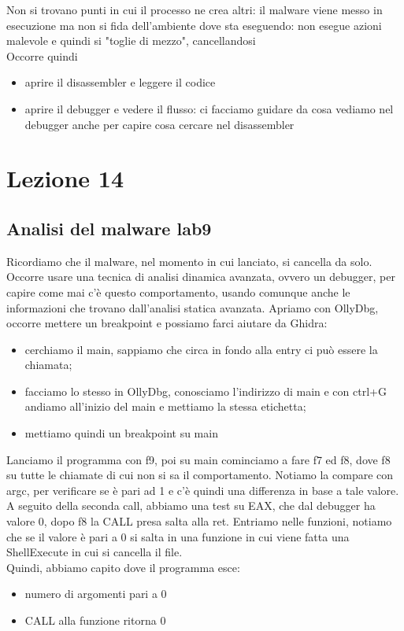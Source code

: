 \documentclass[12pt, oneside]{extbook}
\begin{document}
Non si trovano punti in cui il processo ne crea altri: il malware viene messo in esecuzione ma non si fida dell'ambiente dove sta eseguendo: non esegue azioni malevole e quindi si "toglie di mezzo", cancellandosi\\Occorre quindi
\begin{itemize}
\item aprire il disassembler e leggere il codice
\item aprire il debugger e vedere il flusso: ci facciamo guidare da cosa vediamo nel debugger anche per capire cosa cercare nel disassembler
\end{itemize}
\chapter{Lezione 14}
\section{Analisi del malware lab9}
Ricordiamo che il malware, nel momento in cui lanciato, si cancella da solo.\\Occorre usare una tecnica di analisi dinamica avanzata, ovvero un debugger, per capire come mai c'è questo comportamento, usando comunque anche le informazioni che trovano dall'analisi statica avanzata. Apriamo con OllyDbg, occorre mettere un breakpoint e possiamo farci aiutare da Ghidra:
\begin{itemize}
\item cerchiamo il main, sappiamo che circa in fondo alla entry ci può essere la chiamata;
\item facciamo lo stesso in OllyDbg, conosciamo l'indirizzo di main e con ctrl+G andiamo all'inizio del main e mettiamo la stessa etichetta;
\item mettiamo quindi un breakpoint su main
\end{itemize}
Lanciamo il programma con f9, poi su main cominciamo a fare f7 ed f8, dove f8 su tutte le chiamate di cui non si sa il comportamento. Notiamo la compare con argc, per verificare se è pari ad 1 e c'è  quindi una differenza in base a tale valore. A seguito della seconda call, abbiamo una test su EAX, che dal debugger ha valore 0, dopo f8 la CALL presa salta alla ret. Entriamo nelle funzioni, notiamo che se il valore è pari a 0 si salta in una funzione in cui viene fatta una ShellExecute in cui si cancella il file.\\Quindi, abbiamo capito dove il programma esce:
\begin{itemize}
\item numero di argomenti pari a 0
\item CALL alla funzione ritorna 0
\end{itemize}
\end{document}

